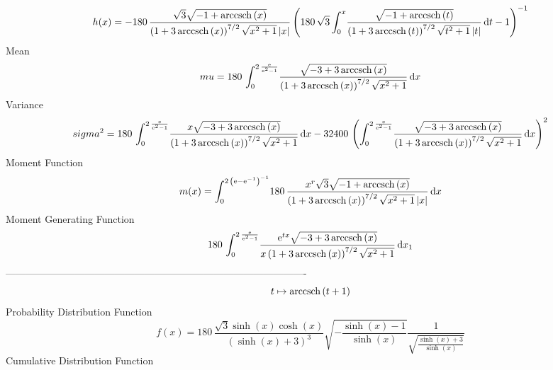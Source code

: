 \documentclass[12pt]{article}
\begin{document}
 $$ h(x)=-180\,{\frac {\sqrt {3}\sqrt {-1+{\rm arccsch} \left(x\right)}}{
 \left( 1+3\,{\rm arccsch} \left(x\right) \right) ^{7/2}\sqrt {{x}^{2}
+1} \left| x \right| } \left( 180\,\sqrt {3}\int_{0}^{x}\!{\frac {
\sqrt {-1+{\rm arccsch} \left(t\right)}}{ \left( 1+3\,{\rm arccsch} 
\left(t\right) \right) ^{7/2}\sqrt {{t}^{2}+1} \left| t \right| }}
\,{\rm d}t-1 \right) ^{-1}}
$$Mean 
 $$ mu=180\,\int_{0}^{2\,{\frac {{\rm e}}{{{\rm e}^{2}}-1}}}\!{\frac {\sqrt {
-3+3\,{\rm arccsch} \left(x\right)}}{ \left( 1+3\,{\rm arccsch} \left(
x\right) \right) ^{7/2}\sqrt {{x}^{2}+1}}}\,{\rm d}x
$$ Variance 
 $$ sigma^2 = 180\,\int_{0}^{2\,{\frac {{\rm e}}{{{\rm e}^{2}}-1}}}\!{\frac {x\sqrt 
{-3+3\,{\rm arccsch} \left(x\right)}}{ \left( 1+3\,{\rm arccsch} 
\left(x\right) \right) ^{7/2}\sqrt {{x}^{2}+1}}}\,{\rm d}x-32400\,
 \left( \int_{0}^{2\,{\frac {{\rm e}}{{{\rm e}^{2}}-1}}}\!{\frac {
\sqrt {-3+3\,{\rm arccsch} \left(x\right)}}{ \left( 1+3\,{\rm arccsch}
 \left(x\right) \right) ^{7/2}\sqrt {{x}^{2}+1}}}\,{\rm d}x \right) ^{
2}
$$Moment Function 
 $$ m(x) = \int_{0}^{2\, \left( {\rm e}-{{\rm e}^{-1}} \right) ^{-1}}\!180\,{
\frac {{x}^{r}\sqrt {3}\sqrt {-1+{\rm arccsch} \left(x\right)}}{
 \left( 1+3\,{\rm arccsch} \left(x\right) \right) ^{7/2}\sqrt {{x}^{2}
+1} \left| x \right| }}\,{\rm d}x
$$ Moment Generating Function 
 $$180\,\int_{0}^{2\,{\frac {{\rm e}}{{{\rm e}^{2}}-1}}}\!{\frac {{
{\rm e}^{tx}}\sqrt {-3+3\,{\rm arccsch} \left(x\right)}}{x \left( 1+3
\,{\rm arccsch} \left(x\right) \right) ^{7/2}\sqrt {{x}^{2}+1}}}
\,{\rm d}x_{{1}}
$$-------------------------------------------------------------------------------------------  \\$$t\mapsto {\rm arccsch} \left(t+1\right)
$$Probability Distribution Function 
$$  f(x)=180\,{\frac {\sqrt {3}\sinh \left( x \right) \cosh \left( x \right) }{
 \left( \sinh \left( x \right) +3 \right) ^{3}}\sqrt {-{\frac {\sinh
 \left( x \right) -1}{\sinh \left( x \right) }}}{\frac {1}{\sqrt {{
\frac {\sinh \left( x \right) +3}{\sinh \left( x \right) }}}}}}
$$Cumulative Distribution Function  
\end{document}
